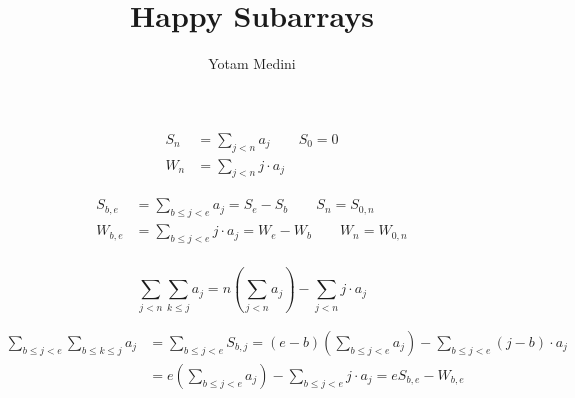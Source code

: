 \documentclass[12pt]{article}
\title{Happy Subarrays}
\author{Yotam Medini}
\begin{document}
\maketitle

\begin{align*}
  S_n &= \sum_{j<n} a_j \qquad S_0 = 0 \\
  W_n &= \sum_{j<n} j\cdot a_j
\end{align*}

\begin{align*}
  S_{b,e} &= \sum_{b\leq j<e} a_j = S_e - S_b         \qquad S_n = S_{0,n} \\
  W_{b,e} &= \sum_{b\leq j<e} j\cdot a_j = W_e - W_b  \qquad W_n = W_{0,n} \\
\end{align*}

\begin{equation*}
  \sum_{j<n} \sum_{k\leq j} a_j
  = n\left(\sum_{j<n} a_j\right) - \sum_{j<n} j\cdot a_j
\end{equation*}

\begin{align*}
  \sum_{b\leq j<e} \sum_{b\leq k\leq j} a_j
  &= \sum_{b\leq j<e} S_{b,j} 
     = (e - b)\left(\sum_{b\leq j<e} a_j\right) - \sum_{b\leq j<e} (j-b)\cdot a_j \\
  &= e\left(\sum_{b\leq j<e} a_j\right) - \sum_{b\leq j<e} j\cdot a_j 
     = e S_{b,e} - W_{b,e}
\end{align*}
\end{document}

